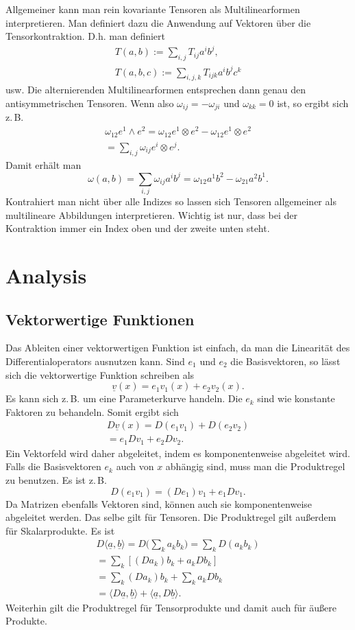 \documentclass[a4paper,10pt,fleqn,twocolumn,twoside]{article}
\begin{document}
Allgemeiner kann man rein kovariante Tensoren als Multilinearformen
interpretieren. Man definiert dazu die Anwendung auf Vektoren über die
Tensorkontraktion. D.h. man definiert
\begin{gather*}
T(a,b) := \sum_{i,j} T_{ij}a^ib^j,\\
T(a,b,c) := \sum_{i,j,k} T_{ijk}a^ib^jc^k
\end{gather*}
usw. Die alternierenden Multilinearformen entsprechen dann genau
den antisymmetrischen Tensoren. Wenn also $\omega_{ij}=-\omega_{ji}$
und $\omega_{kk}=0$ ist, so ergibt sich z.\,B.
\begin{gather*}
\omega_{12}e^1\wedge e^2
= \omega_{12}e^1\otimes e^2-\omega_{12}e^1\otimes e^2\\
= \sum_{i,j}\omega_{ij}e^i\otimes e^j.
\end{gather*}
Damit erhält man
\[\omega(a,b) = \sum_{i,j}\omega_{ij}a^ib^j
= \omega_{12}a^1b^2-\omega_{21}a^2b^1.\]
Kontrahiert man nicht über alle Indizes so lassen sich Tensoren
allgemeiner als multilineare Abbildungen interpretieren. Wichtig ist
nur, dass bei der Kontraktion immer ein Index oben und der zweite
unten steht.

\section{Analysis}
\subsection{Vektorwertige Funktionen}

Das Ableiten einer vektorwertigen Funktion ist einfach, da man
die Linearität des Differentialoperators ausnutzen kann. Sind $e_1$
und $e_2$ die Basisvektoren, so lässt sich die vektorwertige
Funktion schreiben als
\[\underline v(x) = e_1v_1(x)+e_2v_2(x).\]
Es kann sich z.\,B. um eine Parameterkurve handeln. Die $e_k$ sind
wie konstante Faktoren zu behandeln. Somit ergibt sich
\begin{gather*}
D\underline v(x) = D(e_1v_1)+D(e_2v_2)\\
= e_1Dv_1+e_2Dv_2.
\end{gather*}
Ein Vektorfeld wird daher abgeleitet, indem es komponentenweise
abgeleitet wird. Falls die Basisvektoren $e_k$
auch von $x$ abhängig sind, muss man die Produktregel zu benutzen.
Es ist z.\,B.
\[D(e_1v_1) = (De_1)v_1+e_1Dv_1.\]
Da Matrizen ebenfalls Vektoren sind, können auch sie komponentenweise
abgeleitet werden. Das selbe gilt für Tensoren. Die Produktregel
gilt außerdem für Skalarprodukte. Es ist
\begin{gather*}D\langle\underline a,\underline b\rangle
= D\Big(\sum\nolimits_k a_kb_k\Big) = \sum\nolimits_k D(a_kb_k)\\
= \sum\nolimits_k [(Da_k)b_k+a_kDb_k]\\
= \sum\nolimits_k (Da_k)b_k + \sum\nolimits_k a_kDb_k\\
= \langle D\underline a,\underline b\rangle
+ \langle \underline a,D\underline b\rangle.
\end{gather*}
Weiterhin gilt die Produktregel für Tensorprodukte und damit auch
für äußere Produkte.
\end{document}

